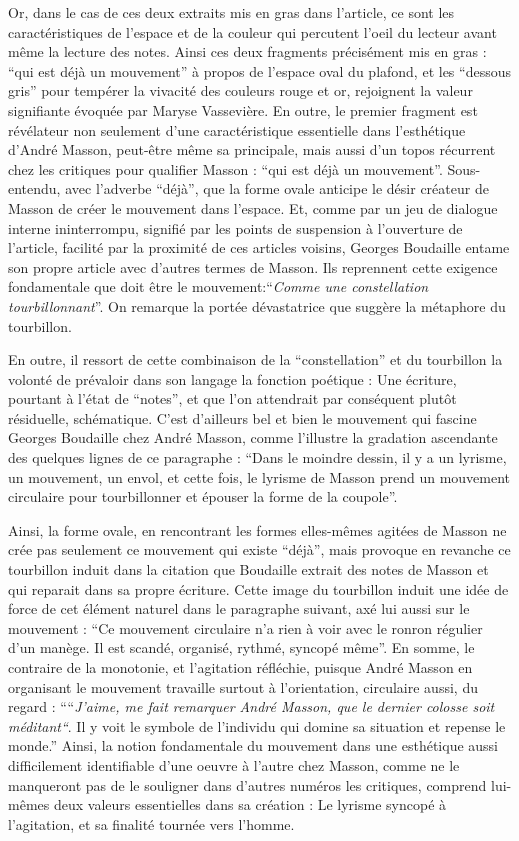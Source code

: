 	 Or, dans le cas de ces deux extraits mis en gras dans l'article, ce sont les caractéristiques de l’espace et de la couleur qui percutent l’oeil du lecteur avant même la lecture des notes. Ainsi ces deux fragments précisément mis en gras : \enquote{qui est déjà un mouvement} à propos de l’espace oval du plafond, et  les \enquote{dessous gris} pour tempérer la vivacité des couleurs rouge et or, rejoignent la valeur signifiante évoquée par Maryse Vassevière. En outre, le premier fragment est révélateur non seulement d’une caractéristique essentielle dans l’esthétique d’André Masson, peut-être même sa principale, mais aussi d’un topos récurrent chez les critiques pour qualifier Masson : \enquote{qui est déjà un mouvement}. Sous-entendu, avec l’adverbe \enquote{déjà}, que la forme ovale anticipe le désir créateur de Masson de créer le mouvement dans l’espace. Et, comme par un jeu de dialogue interne ininterrompu, signifié par les points de suspension à l’ouverture de l’article, facilité par la proximité de ces articles voisins, Georges Boudaille entame son propre article avec d’autres termes de Masson. Ils reprennent cette exigence fondamentale que doit être le mouvement:\enquote{\emph{Comme une constellation tourbillonnant}}.  On remarque la portée dévastatrice que suggère la métaphore du tourbillon. 

	En outre, il  ressort de cette combinaison de la \enquote{constellation} et du tourbillon la volonté de prévaloir dans son langage la fonction poétique : Une écriture, pourtant à l’état de \enquote{notes}, et que l’on attendrait par conséquent plutôt résiduelle, schématique. C’est d’ailleurs bel et bien le mouvement qui fascine Georges Boudaille chez André Masson, comme l’illustre la gradation ascendante des quelques lignes de ce paragraphe : \enquote{Dans le moindre dessin, il y a un lyrisme, un mouvement, un envol, et cette fois, le lyrisme de Masson prend un mouvement circulaire pour tourbillonner et épouser la forme de la coupole}. 

	Ainsi, la forme ovale, en rencontrant les formes elles-mêmes agitées de Masson ne crée pas seulement ce mouvement qui existe \enquote{déjà}, mais provoque en revanche ce tourbillon induit dans la citation que Boudaille extrait des notes de Masson et qui reparait dans sa propre écriture. Cette image du tourbillon induit une idée de force de cet élément naturel dans le paragraphe suivant, axé lui aussi sur le mouvement : \enquote{Ce mouvement circulaire n’a rien à voir avec le ronron régulier d’un manège. Il est scandé, organisé, rythmé, syncopé même}. En somme, le contraire de la monotonie, et l’agitation réfléchie, puisque André Masson en organisant le mouvement travaille surtout à l’orientation, circulaire aussi, du regard : \enquote{“\emph{J’aime, me fait remarquer André Masson, que le dernier colosse soit méditant“}. Il y voit le symbole de l’individu qui domine sa situation et repense le monde.} Ainsi, la notion fondamentale du mouvement dans une esthétique aussi difficilement identifiable d’une oeuvre à l’autre chez Masson, comme ne le manqueront pas de le souligner dans d’autres numéros les critiques, comprend lui-mêmes deux valeurs essentielles dans sa création : Le lyrisme syncopé à l’agitation, et sa finalité tournée vers l’homme. 

